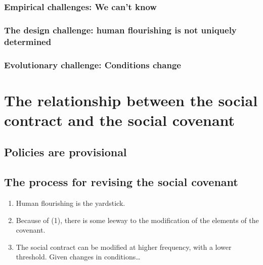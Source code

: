 \documentclass[
]{book}
\providecommand{\tightlist}{%
  \setlength{\itemsep}{0pt}\setlength{\parskip}{0pt}}
\begin{document}
\hypertarget{empirical-challenges-we-cant-know}{%
\subsection{Empirical challenges: We can't know}\label{empirical-challenges-we-cant-know}}

\hypertarget{the-design-challenge-human-flourishing-is-not-uniquely-determined}{%
\subsection{The design challenge: human flourishing is not uniquely determined}\label{the-design-challenge-human-flourishing-is-not-uniquely-determined}}

\hypertarget{evolutionary-challenge-conditions-change}{%
\subsection{Evolutionary challenge: Conditions change}\label{evolutionary-challenge-conditions-change}}

\hypertarget{the-relationship-between-the-social-contract-and-the-social-covenant}{%
\chapter{The relationship between the social contract and the social covenant}\label{the-relationship-between-the-social-contract-and-the-social-covenant}}

\hypertarget{policies-are-provisional}{%
\section{Policies are provisional}\label{policies-are-provisional}}

\hypertarget{the-process-for-revising-the-social-covenant}{%
\section{The process for revising the social covenant}\label{the-process-for-revising-the-social-covenant}}

\begin{enumerate}
\def\labelenumi{\arabic{enumi}.}
\tightlist
\item
  Human flourishing is the yardstick.
\item
  Because of (1), there is some leeway to the modification of the
  elements of the covenant.
\item
  The social contract can be modified at higher frequency, with a
  lower threshold. Given changes in conditions\ldots{}
\end{enumerate}
\end{document}
